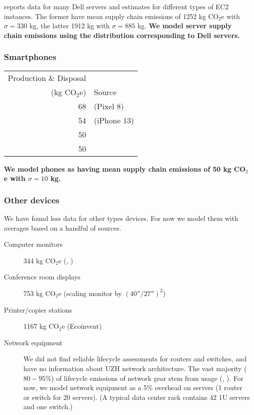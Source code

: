 \documentclass[11pt]{article}
\newcommand{\assumption}[1]{{\bf #1}}
\begin{document}
\textcite{davy2021} reports data for many Dell servers and estimates for different types of EC2 instances.
The former have mean supply chain emissions of 1252 kg CO$_2$e with $\sigma = 330$ kg, the latter
1912 kg with $\sigma = 885$ kg.
\assumption{We model server supply chain emissions using the distribution corresponding to Dell servers.}

\subsubsection*{Smartphones}

\begin{center}
\begin{tabular}{|r|l|}
\hline
Production \& Disposal & \\
(kg CO$_2$e) & Source \\ \hline
68 & \textcite{googlepixel8} (Pixel 8)\\ \hline
54 & \textcite{appleiphone13} (iPhone 13)\\ \hline
50 & \textcite{unctadder2024} \\ \hline
50 & \textcite{lovehagen2023} \\ \hline
\end{tabular}
\label{tab:embodied_emissions:phones}
\end{center}

\assumption{We model phones as having mean supply chain emissions of 50 kg CO$_2$e with $\sigma = 10$ kg.}

\subsubsection*{Other devices}

We have found less data for other types devices. For now we model them with averages based
on a handful of sources.

\begin{description}
    \item[Computer monitors] 344 kg CO$_2$e (\textcite{teehan2013}, \textcite{dellpcf})
    \item[Conference room displays] 753 kg CO$_2$e (scaling monitor by $(40''/27'')^2$)
    \item[Printer/copier stations] 1167 kg CO$_2$e (Ecoinvent)
    \item[Network equipment] We did not find reliable lifecycle assessments for routers and switches,
      and have no information about UZH network architecture. The vast majority ($80-95\%$) of
      lifecycle emissions of network gear stem from usage (\textcite{cisco2024}, \textcite{jacob2023}).
      For now, we model network equipment as a 5\% overhead on servers (1 router or switch for 20 servers).
      (A typical data center rack contains 42 1U servers and one switch.)
\end{description}
\end{document}
